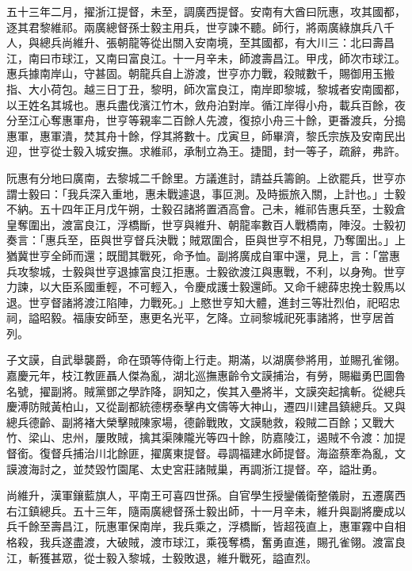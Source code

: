 \begin{pinyinscope}
五十三年二月，擢浙江提督，未至，調廣西提督。安南有大酋曰阮惠，攻其國都，逐其君黎維祁。兩廣總督孫士毅主用兵，世亨諫不聽。師行，將兩廣綠旗兵八千人，與總兵尚維升、張朝龍等從出關入安南境，至其國都，有大川三：北曰壽昌江，南曰市球江，又南曰富良江。十一月辛未，師渡壽昌江。甲戌，師次市球江。惠兵據南岸山，守甚固。朝龍兵自上游渡，世亨亦力戰，殺賊數千，賜御用玉搬指、大小荷包。越三日丁丑，黎明，師次富良江，南岸即黎城，黎城者安南國都，以王姓名其城也。惠兵盡伐濱江竹木，斂舟泊對岸。循江岸得小舟，載兵百餘，夜分至江心奪惠軍舟，世亨等親率二百餘人先渡，復掠小舟三十餘，更番渡兵，分搗惠軍，惠軍潰，焚其舟十餘，俘其將數十。戊寅旦，師畢濟，黎氏宗族及安南民出迎，世亨從士毅入城安撫。求維祁，承制立為王。捷聞，封一等子，疏辭，弗許。

阮惠有分地曰廣南，去黎城二千餘里。方議進討，請益兵籌餉。上欲罷兵，世亨亦謂士毅曰：「我兵深入重地，惠未戰遽退，事叵測。及時振旅入關，上計也。」士毅不納。五十四年正月戊午朔，士毅召諸將置酒高會。己未，維祁告惠兵至，士毅倉皇奪圍出，渡富良江，浮橋斷，世亨與維升、朝龍率數百人戰橋南，陣沒。士毅初奏言：「惠兵至，臣與世亨督兵決戰；賊眾圍合，臣與世亨不相見，乃奪圍出。」上猶冀世亨全師而還；既聞其戰死，命予恤。副將廣成自軍中還，見上，言：「當惠兵攻黎城，士毅與世亨退據富良江拒惠。士毅欲渡江與惠戰，不利，以身殉。世亨力諫，以大臣系國重輕，不可輕入，令慶成護士毅還師。又命千總薛忠挽士毅馬以退。世亨督諸將渡江陷陣，力戰死。」上愍世亨知大體，進封三等壯烈伯，祀昭忠祠，謚昭毅。福康安師至，惠更名光平，乞降。立祠黎城祀死事諸將，世亨居首列。

子文謨，自武舉襲爵，命在頭等侍衛上行走。期滿，以湖廣參將用，並賜孔雀翎。嘉慶元年，枝江教匪聶人傑為亂，湖北巡撫惠齡令文謨捕治，有勞，賜繼勇巴圖魯名號，擢副將。賊黨鄧之學詐降，詗知之，俟其入壘將半，文謨突起擒斬。從總兵慶溥防賊黃柏山，又從副都統德楞泰擊冉文儔等大神山，遷四川建昌鎮總兵。又與總兵德齡、副將褚大榮擊賊陳家場，德齡戰敗，文謨馳救，殺賊二百餘；又戰大竹、梁山、忠州，屢敗賊，擒其渠陳隴光等四十餘，防嘉陵江，遏賊不令渡：加提督銜。復督兵捕治川北餘匪，擢廣東提督。尋調福建水師提督。海盜蔡牽為亂，文謨渡海討之，並焚毀竹園尾、太史宮莊諸賊巢，再調浙江提督。卒，謚壯勇。

尚維升，漢軍鑲藍旗人，平南王可喜四世孫。自官學生授鑾儀衛整儀尉，五遷廣西右江鎮總兵。五十三年，隨兩廣總督孫士毅出師，十一月辛未，維升與副將慶成以兵千餘至壽昌江，阮惠軍保南岸，我兵乘之，浮橋斷，皆超筏直上，惠軍霧中自相格殺，我兵遂盡渡，大破賊，渡市球江，乘筏奪橋，奮勇直進，賜孔雀翎。渡富良江，斬獲甚眾，從士毅入黎城，士毅敗退，維升戰死，謚直烈。


\end{pinyinscope}
